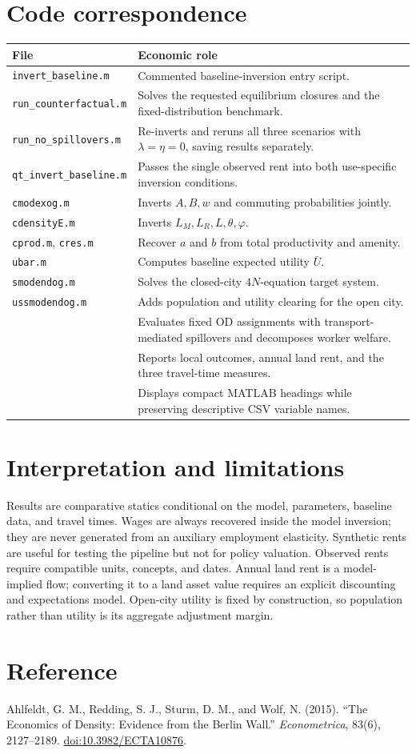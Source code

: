 \documentclass[11pt,a4paper]{article}
\begin{document}
\section{Code correspondence}
\begin{longtable}{P{4.3cm}P{9.2cm}}
\toprule File & Economic role\\ \midrule
\texttt{invert\_baseline.m} & Commented baseline-inversion entry script.\\
\texttt{run\_counterfactual.m} & Solves the requested equilibrium closures and the fixed-distribution benchmark.\\
\texttt{run\_no\_spillovers.m} & Re-inverts and reruns all three scenarios with $\lambda=\eta=0$, saving results separately.\\
\texttt{qt\_invert\_baseline.m} & Passes the single observed rent into both use-specific inversion conditions.\\
\texttt{cmodexog.m} & Inverts $A,B,w$ and commuting probabilities jointly.\\
\texttt{cdensityE.m} & Inverts $L_M,L_R,L,\theta,\varphi$.\\
\texttt{cprod.m}, \texttt{cres.m} & Recover $a$ and $b$ from total productivity and amenity.\\
\texttt{ubar.m} & Computes baseline expected utility $\bar U$.\\
\texttt{smodendog.m} & Solves the closed-city $4N$-equation target system.\\
\texttt{ussmodendog.m} & Adds population and utility clearing for the open city.\\
 & Evaluates fixed OD assignments with transport-mediated spillovers and decomposes worker welfare.\\
 & Reports local outcomes, annual land rent, and the three travel-time measures.\\
 & Displays compact MATLAB headings while preserving descriptive CSV variable names.\\
\bottomrule
\end{longtable}

\section{Interpretation and limitations}
Results are comparative statics conditional on the model, parameters, baseline
data, and travel times. Wages are always recovered inside the model inversion;
they are never generated from an auxiliary employment elasticity. Synthetic
rents are useful for testing the pipeline but not for policy valuation. Observed rents require compatible
units, concepts, and dates. Annual land rent is a model-implied flow; converting
it to a land asset value requires an explicit discounting and expectations
model. Open-city utility is fixed by construction, so population rather than
utility is its aggregate adjustment margin.

\section*{Reference}
Ahlfeldt, G. M., Redding, S. J., Sturm, D. M., and Wolf, N. (2015).
``The Economics of Density: Evidence from the Berlin Wall.''
\emph{Econometrica}, 83(6), 2127--2189.
\href{https://doi.org/10.3982/ECTA10876}{doi:10.3982/ECTA10876}.
\end{document}
